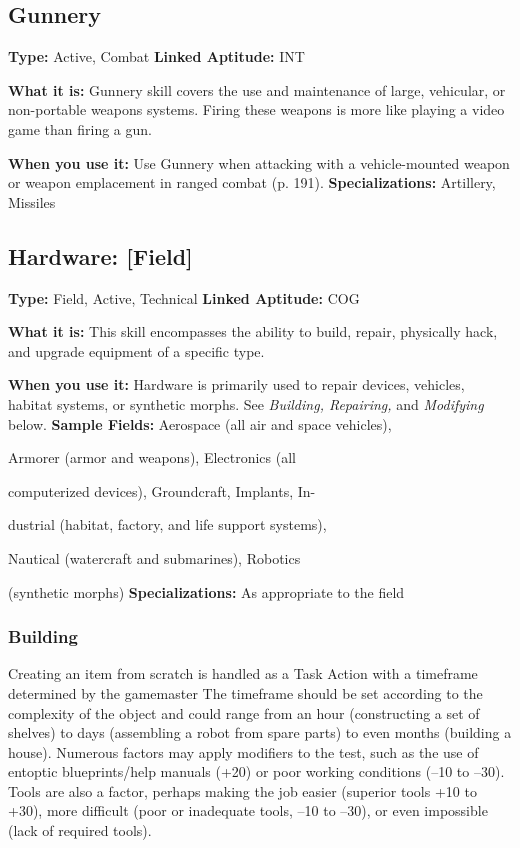 \subsection{Gunnery}

\textbf{Type:} Active, Combat
\textbf{Linked Aptitude:} INT

\textbf{What it is:} Gunnery skill covers the use and maintenance
of large, vehicular, or non-portable weapons
systems. Firing these weapons is more like playing a 
video game than firing a gun.

\textbf{When you use it:} Use Gunnery when attacking with 
a vehicle-mounted weapon or weapon emplacement 
in ranged combat (p. 191).
\textbf{Specializations:} Artillery, Missiles

\subsection{Hardware: [Field]}

\textbf{Type:} Field, Active, Technical
\textbf{Linked Aptitude:} COG

\textbf{What it is:} This skill encompasses the ability to 
build, repair, physically hack, and upgrade equipment 
of a specific type.

\textbf{When you use it:} Hardware is primarily used to repair 
devices, vehicles, habitat systems, or synthetic morphs. 
See \textit{Building, Repairing,} and \textit{Modifying} below.
\textbf{Sample Fields:} Aerospace (all air and space vehicles), 

Armorer (armor and weapons), Electronics (all 

computerized devices), Groundcraft, Implants, In-

dustrial (habitat, factory, and life support systems), 

Nautical (watercraft and submarines), Robotics 

(synthetic morphs)
\textbf{Specializations:} As appropriate to the field

\subsubsection{Building}

Creating an item from scratch is handled as a Task 
Action with a timeframe determined by the gamemaster
The timeframe should be set according to the complexity
of the object and could range from an hour
(constructing a set of shelves) to days (assembling a 
robot from spare parts) to even months (building a 
house). Numerous factors may apply modifiers  to 
the test, such as the use of entoptic blueprints/help 
manuals (+20) or poor working conditions (–10 to 
–30). Tools are also a factor, perhaps making the job 
easier (superior tools +10 to +30), more difficult (poor 
or inadequate tools, –10 to –30), or even impossible 
(lack of required tools).

